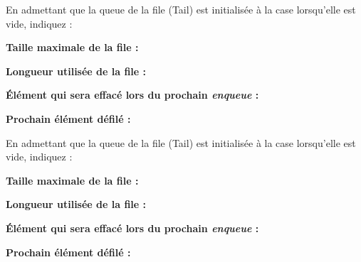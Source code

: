 \documentclass[11pt,a4paper]{article}
\begin{document}
\begin{center}
En admettant que la queue de la file (Tail) est initialisée à la case  \fg{} lorsqu'elle est vide, indiquez :

\begin{table}[ht!]
  \centering
  \begin{minipage}{0.4\textwidth}

\textbf{Taille maximale de la file :}

\vspace*{1.5cm}

\textbf{Longueur utilisée de la file :}

  \end{minipage}
  \hfillx
  \begin{minipage}{0.6\textwidth}

\textbf{\'Elément qui sera effacé lors du prochain \textit{enqueue} :}

\vspace*{1.5cm}

\textbf{Prochain élément défilé :}

  \end{minipage}
\end{table}


\vspace*{1cm}


En admettant que la queue de la file (Tail) est initialisée à la case  \fg{} lorsqu'elle est vide, indiquez :

\begin{table}[ht!]
  \centering
  \begin{minipage}{0.4\textwidth}

\textbf{Taille maximale de la file :}

\vspace*{1.5cm}

\textbf{Longueur utilisée de la file :}

  \end{minipage}
  \hfillx
  \begin{minipage}{0.6\textwidth}

\textbf{\'Elément qui sera effacé lors du prochain \textit{enqueue} :}

\vspace*{1.5cm}

\textbf{Prochain élément défilé :}

  \end{minipage}
\end{table}
\end{center}
\end{document}
